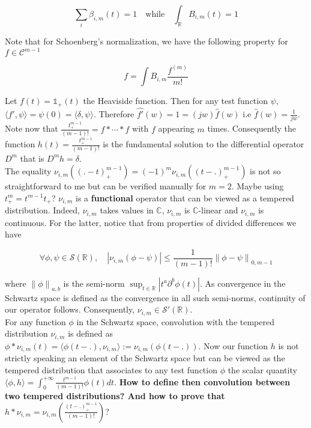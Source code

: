 \documentclass[a4paper, 11pt]{article}
\begin{document}
\begin{equation*}
  \sum_{i} \beta_{i,m}(t) = 1 \quad \text{while} \quad \int_{\mathbb{R}} B_{i,m}(t) = 1
\end{equation*}

Note that for Schoenberg's normalization, we have the following property for $f \in \mathcal{C}^{m-1}$

\begin{equation}
  [x_i, \ldots, x_{i+m}]f = \int B_{i,m} \frac{f^{(m)}}{m!}
\end{equation}

Let $f(t) = \mathds{1}_{+}(t)$ the Heaviside function. Then for any test function $\psi$, $\langle f', \psi \rangle = 
\psi(0) = \langle \delta, \psi \rangle$. Therefore $\hat{f'}(w) = 1 = (jw)\hat{f}(w)$ i.e $\hat{f}(w) = \frac{1}{jw}$.  
Note now that $\frac{t_+^{m-1}}{(m-1)!} = f * \cdots * f$ with $f$ appearing $m$ times. Consequently the function $h(t) 
= \frac{t_+^{m-1}}{(m-1)!}$ is the fundamental solution to the differential operator $D^m$ that is $D^m h = \delta$. \\

The equality $\nu_{i,m}({(.-t)}_+^{m-1}) = {(-1)}^m \nu_{i,m}({(t-.)}_+^{m-1})$ is not so straightforward to me but can 
be verified manually for $m=2$. Maybe using $t_+^m = t^{m-1} t_+$? $\nu_{i,m}$ is a \textbf{functional} operator that 
can be viewed as a tempered distribution. Indeed, $\nu_{i,m}$ takes values in $\mathbb{C}$, $\nu_{i,m}$ is 
$\mathbb{C}$-linear and $\nu_{i,m}$ is continuous. For the latter, notice that from properties of divided differences we 
have

\begin{equation}
  \forall \phi, \psi \in \mathcal{S}(\mathbb{R}), \quad |\nu_{i,m}(\phi-\psi)| \leq \frac{1}{(m-1)!} {\|\phi-\psi\|}_{0, 
  m-1}
\end{equation}

where ${\|\phi\|}_{a,b}$ is the semi-norm $\sup_{t \in \mathbb{R}} |t^a \partial^b \phi(t)|$. As convergence in the 
Schwartz space is defined as the convergence in all such semi-norms, continuity of our operator follows. Consequently, 
$\nu_{i,m} \in \mathcal{S}'(\mathbb{R})$. \\

For any function $\phi$ in the Schwartz space, convolution with the tempered distribution $\nu_{i,m}$ is defined as 
$\phi * \nu_{i,m}(t) = \langle \phi(t-.), \nu_{i,m} \rangle := \nu_{i,m}(\phi(t-.))$. Now our function $h$ is not 
strictly speaking an element of the Schwartz space but can be viewed as the tempered distribution that associates to any 
test function $\phi$ the scalar quantity $\langle \phi, h \rangle = \int_{0}^{+\infty} \frac{t^{m-1}}{(m-1)!} 
\phi(t)dt$.  \textbf{How to define then convolution between two tempered distributions? And how to prove that $h * 
\nu_{i,m} = \nu_{i,m}(\frac{{(t-.)}^{m-1}_+}{(m-1)!})$}? \\
\end{document}
